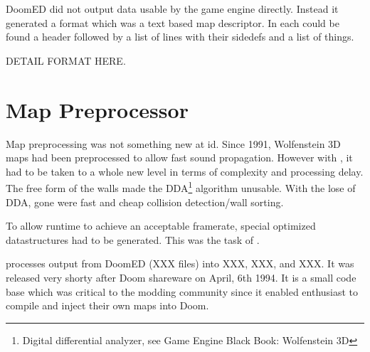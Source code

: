 DoomED did not output data usable by the game engine directly. Instead it generated a  format which was a text based map descriptor. In each  could be found a header followed by a list of lines with their sidedefs and a list of things.\\
\par
{}
\par
DETAIL FORMAT HERE.
\par
{}
\par

\pagebreak





\section{Map Preprocessor}
Map preprocessing was not something new at id. Since 1991, Wolfenstein 3D maps had been preprocessed to allow fast sound propagation. However with \doom, it had to be taken to a whole new level in terms of complexity and processing delay. The free form of the walls made the DDA\footnote{Digital differential analyzer, see Game Engine Black Book: Wolfenstein 3D} algorithm unusable. With the lose of DDA, gone were fast and cheap collision detection/wall sorting.\\
\par
To allow runtime to achieve an acceptable framerate, special optimized datastructures had to be generated. This was the task of 
.\\
\par
 processes output from DoomED (XXX files) into XXX, XXX, and XXX. It was released very shorty after Doom shareware on April, 6th 1994. It is a small code base which was critical to the modding community since it enabled enthusiast to compile and inject their own maps into Doom.\\
\par
{}
\par





